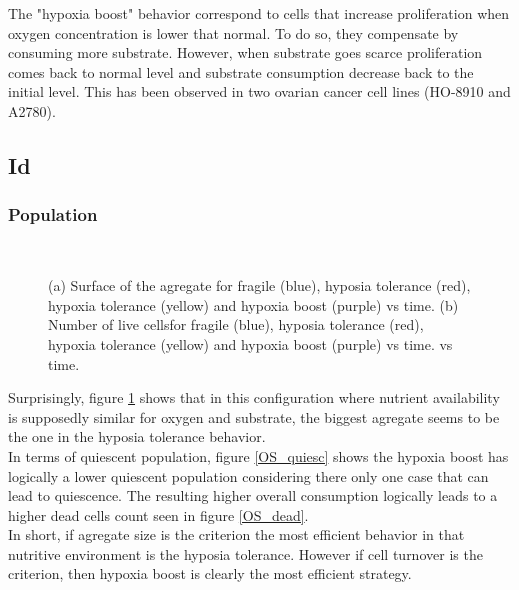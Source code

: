 \documentclass[11pt,a4paper]{article}
\begin{document}
The "hypoxia boost" behavior correspond to cells that increase proliferation when oxygen concentration is lower that normal. To do so, they compensate by consuming more substrate. However, when substrate goes scarce proliferation comes back to normal level and substrate consumption decrease back to the initial level. This has been observed in two ovarian cancer cell lines (HO-8910 and A2780).\cite{Li2023}\\ 

\newpage
\subsection{Id}
\subsubsection{Population}
\begin{figure}[h]
\begin{subfigure}{0.5\textwidth}
	\centering
	
	\caption{ \label{OS_area}}
\end{subfigure}
~~
\begin{subfigure}{0.5\textwidth}
	\centering
	
	\caption{\label{OS_live}}
\end{subfigure}
\caption{(a) Surface of the agregate for fragile (blue), hyposia tolerance (red), hypoxia tolerance (yellow) and hypoxia boost (purple) vs time. (b) Number of live cellsfor fragile (blue), hyposia tolerance (red), hypoxia tolerance (yellow) and hypoxia boost (purple) vs time. vs time. \label{OS_area_live}}
\end{figure}

Surprisingly, figure \ref{OS_area} shows that in this configuration where nutrient availability is supposedly similar for oxygen and substrate, the biggest agregate seems to be the one in the hyposia tolerance behavior.\\

In terms of quiescent population, figure \ref{OS_quiesc} shows the hypoxia boost has logically a lower quiescent population considering there only one case that can lead to quiescence. The resulting higher overall consumption logically leads to a higher dead cells count seen in figure \ref{OS_dead}.\\

In short, if agregate size is the criterion the most efficient behavior in that nutritive environment is the hyposia tolerance. However if cell turnover is the criterion, then hypoxia boost is clearly the most efficient strategy.\\
\end{document}
